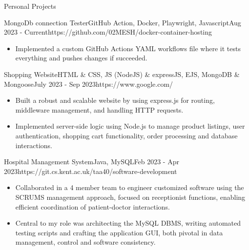 \documentclass[11pt]{article}
\newlength{\secsep}
\newlength{\seperate}
\newcommand{\coloredhrulefill}[2][black]{%
    \leavevmode%
    \leaders\hbox{\textcolor{#1}{\rule{1ex}{0.5pt}}}\hfill\kern0pt%
}
\newcommand{\lineunder}{\vspace*{-8pt} \hspace*{-6pt} \coloredhrulefill[contactgrey]{}  \\* \vspace*{-8pt}}
\newenvironment{tabbedList}[1]{
	\begin{list}{}{
      \setlength{\itemsep}{0pt}
      \setlength{\labelsep}{0pt}
      \setlength{\labelwidth}{0pt}
      \setlength{\leftmargin}{0pt}
      \setlength{\rightmargin}{0pt}
      \setlength{\listparindent}{0pt}
      \setlength{\parsep}{0pt}
      \setlength{\parskip}{0pt}
      \setlength{\partopsep}{0pt}
      \setlength{\topsep}{#1}
	}
	\item[]
}{\end{list}}
\newenvironment{resume_section}[1] {
	\filbreak
	\vspace{1\secsep}
	\textsc{\Large\textcolor{darkblue}{#1}} \lineunder \vspace*{0.5\secsep}
	\begin{tabbedList}{\secsep}
}{\end{tabbedList}}
\newenvironment{personal_projects}[4] {
	\textbf{#1} \hfill \href{#4}{\color{darkblue}{\faGithub{\footnotesize \hspace*{\secsep}Project Link}}}\\*  %
	{\small Tech Stack: #2} \hfill {\footnotesize \textit{\color{contactgrey}{#3}}}\vspace*{1px}
	
	\begin{tabbedList}{0pt}
}{\end{tabbedList}\vspace*{0.8\secsep}}
\newenvironment{subitems}{
	\vspace*{-2px}
	\renewcommand{\labelitemi}{\color{contactgrey}{\faCode}}
	\begin{itemize}
		\setlength{\labelsep}{0.3em}
		\setlength{\itemsep}{0pt}
		\setlength{\parsep}{0pt}
		\setlength{\topsep}{0px}
}{\end{itemize}}
\begin{document}
	\begin{resume_section}{Personal Projects}
	
		\begin{personal_projects} {MongoDb connection Tester}{GitHub Action, Docker, Playwright, Javascript}{Aug 2023 - Current}{https://github.com/02MESH/docker-container-hosting}
			\begin{subitems}
				\item{Implemented a custom GitHub Actions YAML workflows file where it tests everything and pushes changes if succeeded.}
			\end{subitems}
		\end{personal_projects}	
	
		\vspace*{\seperate}
			
		\begin{personal_projects} {Shopping Website}{HTML \& CSS, JS (NodeJS) \& expressJS, EJS, MongoDB \& Mongoose}{July 2023 - Sep 2023}{https://www.google.com/}
			\begin{subitems}
				\item{Built a robust and scalable website by using express.js for routing, middleware management, and handling HTTP requests.}
				\item{Implemented server-side logic using Node.js to manage product listings, user authentication, shopping cart functionality, order processing and database interactions.}
				\end{subitems}
			\end{personal_projects}
		
		\vspace*{\seperate}	
		
		\begin{personal_projects} {Hospital Management System}{Java, MySQL}{Feb 2023 - Apr 2023}{https://git.cs.kent.ac.uk/taa40/software-development}
			\begin{subitems}
				\item{Collaborated in a 4 member team to engineer customized software using the SCRUMS management approach, focused on receptionist functions, enabling efficient coordination of patient-doctor interactions.}
				\item{Central to my role was architecting the MySQL DBMS, writing automated testing scripts and crafting the application GUI, both pivotal in data management, control and software consistency.}
			\end{subitems}
		\end{personal_projects}		
		

\end{resume_section}
\end{document}
